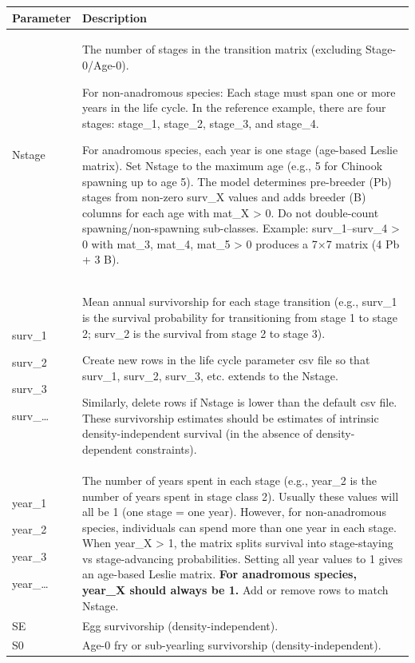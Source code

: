 \documentclass[
  letterpaper,
  DIV=11,
  numbers=noendperiod]{scrreprt}
\begin{document}
\begin{longtable}[]{@{}
  >{\raggedright\arraybackslash}p{}
  >{\raggedright\arraybackslash}p{}@{}}
\toprule\noalign{}
\begin{minipage}[b]{\linewidth}\raggedright
Parameter
\end{minipage} & \begin{minipage}[b]{\linewidth}\raggedright
Description
\end{minipage} \\
\midrule\noalign{}
\endhead
\bottomrule\noalign{}
\endlastfoot
Nstage & The number of stages in the transition matrix (excluding
Stage-0/Age-0).

For non-anadromous species: Each stage must span one or more years in
the life cycle. In the reference example, there are four stages:
stage\_1, stage\_2, stage\_3, and stage\_4.

For anadromous species, each year is one stage (age-based Leslie
matrix). Set Nstage to the maximum age (e.g., 5 for Chinook spawning up
to age 5). The model determines pre-breeder (Pb) stages from non-zero
surv\_X values and adds breeder (B) columns for each age with mat\_X
\textgreater{} 0. Do not double-count spawning/non-spawning sub-classes.
Example: surv\_1--surv\_4 \textgreater{} 0 with mat\_3, mat\_4, mat\_5
\textgreater{} 0 produces a 7×7 matrix (4 Pb + 3 B). \textbar{} \\
surv\_1

surv\_2

surv\_3

surv\_\ldots{} & Mean annual survivorship for each stage transition
(e.g., surv\_1 is the survival probability for transitioning from stage
1 to stage 2; surv\_2 is the survival from stage 2 to stage 3).
\textbar{}

Create new rows in the life cycle parameter csv file so that surv\_1,
surv\_2, surv\_3, etc. extends to the Nstage.

Similarly, delete rows if Nstage is lower than the default csv file.
These survivorship estimates should be estimates of intrinsic
density-independent survival (in the absence of density-dependent
constraints). \\
year\_1

year\_2

year\_3

year\_\ldots{} & The number of years spent in each stage (e.g., year\_2
is the number of years spent in stage class 2). Usually these values
will all be 1 (one stage = one year). However, for non-anadromous
species, individuals can spend more than one year in each stage. When
year\_X \textgreater{} 1, the matrix splits survival into stage-staying
vs stage-advancing probabilities. Setting all year values to 1 gives an
age-based Leslie matrix. \textbf{For anadromous species, year\_X should
always be 1.} Add or remove rows to match Nstage. \textbar{} \\
SE & Egg survivorship (density-independent). \\
S0 & Age-0 fry or sub-yearling survivorship (density-independent). \\
\end{longtable}
\end{document}
